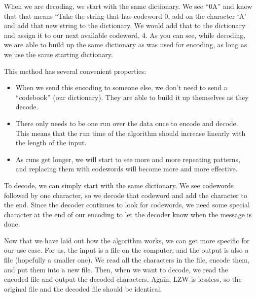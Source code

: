 \documentclass[12pt,twoside]{reedthesis}
\providecommand{\tightlist}{%
  \setlength{\itemsep}{0pt}\setlength{\parskip}{0pt}}
\begin{document}
When we are decoding, we start with the same dictionary. We see ``0A'' and know that that means ``Take the string that has codeword 0, add on the character `A' and add that new string to the dictionary. We would add that to the dictionary and assign it to our next available codeword, 4. As you can see, while decoding, we are able to build up the same dictionary as was used for encoding, as long as we use the same starting dictionary.

This method has several convenient properties:
\begin{itemize}
\tightlist
\item
  When we send this encoding to someone else, we don't need to send a ``codebook'' (our dictionary). They are able to build it up themselves as they decode.
\item
  There only needs to be one run over the data once to encode and decode. This means that the run time of the algorithm should increase linearly with the length of the input.
\item
  As runs get longer, we will start to see more and more repeating patterns, and replacing them with codewords will become more and more effective.
\end{itemize}
To decode, we can simply start with the same dictionary. We see codewords followed by one character, so we decode that codeword and add the character to the end. Since the decoder continues to look for codewords, we need some special character at the end of our encoding to let the decoder know when the message is done.

Now that we have laid out how the algorithm works, we can get more specific for our use case. For us, the input is a file on the computer, and the output is also a file (hopefully a smaller one). We read all the characters in the file, encode them, and put them into a new file. Then, when we want to decode, we read the encoded file and output the decoded characters. Again, LZW is lossless, so the original file and the decoded file should be identical.
\end{document}
